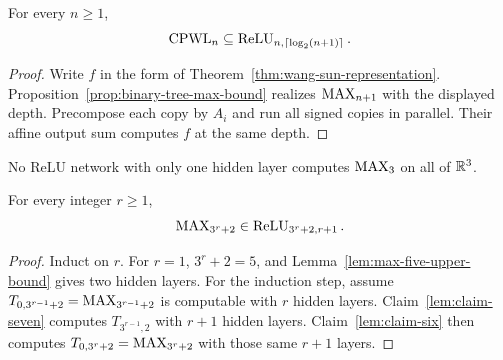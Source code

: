 \begin{theorem}
  \label{thm:previous-cpwl-bound}
  For every $n\geq1$,
  \[
    \operatorname{CPWL}_n\subseteq\operatorname{ReLU}_{n,\lceil\log_2(n+1)\rceil}.
  \]
\end{theorem}
\begin{proof}
  Write $f$ in the form of Theorem~\ref{thm:wang-sun-representation}.
  Proposition~\ref{prop:binary-tree-max-bound} realizes $\operatorname{MAX}_{n+1}$ with the
  displayed depth.  Precompose each copy by $A_i$ and run all signed copies in
  parallel.  Their affine output sum computes $f$ at the same depth.
\end{proof}

\begin{theorem}
  \label{thm:max-three-lower-bound}
  \notready
  No ReLU network with only one hidden layer computes $\operatorname{MAX}_3$ on all of
  $\mathbb{R}^3$.
\end{theorem}

\begin{theorem}
  \label{thm:main-max}
  For every integer $r\geq1$,
  \[
    \operatorname{MAX}_{3^r+2}\in\operatorname{ReLU}_{3^r+2,r+1}.
  \]
\end{theorem}
\begin{proof}
  Induct on $r$.  For $r=1$, $3^r+2=5$, and
  Lemma~\ref{lem:max-five-upper-bound} gives two hidden layers.  For the
  induction step, assume
  $T_{0,3^{r-1}+2}=\operatorname{MAX}_{3^{r-1}+2}$ is computable with $r$ hidden layers.
  Claim~\ref{lem:claim-seven} computes $T_{3^{r-1},2}$ with $r+1$ hidden
  layers.  Claim~\ref{lem:claim-six} then computes
  $T_{0,3^r+2}=\operatorname{MAX}_{3^r+2}$ with those same $r+1$ layers.
\end{proof}

